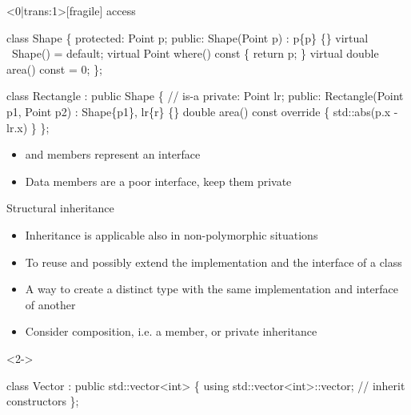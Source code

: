 \begin{frame}<0|trans:1>[fragile]{ access}
  \begin{codeblock}{
class Shape \{
 \alert{protected}:
  Point p;
 public:
  Shape(Point p) : p\{p\} \{\}
  virtual ~Shape() = default;
  virtual Point where() const \{ return p; \}
  virtual double area() const = 0;
\};

class Rectangle : public Shape \{ // is-a
 private:
  Point lr;
 public:
  Rectangle(Point p1, Point p2) : Shape\{p1\}, lr\{r\} \{\}
  double area() const override \{ \ddd std::abs(\alert{p}.x - lr.x) \ddd \}
\};
}\end{codeblock}

  \begin{itemize}[<8->]
  \item {} and  members represent an interface
  \item Data members are a poor interface, keep them private
  \end{itemize}

\end{frame}

\begin{frame}[fragile]{Structural inheritance}

  \begin{itemize}
  \item Inheritance is applicable also in non-polymorphic situations
  \item To reuse and possibly extend the implementation and the interface of a
    class
  \item A way to create a distinct type with the same implementation and
    interface of another
  \item<5-> Consider composition, i.e. a member, or private inheritance
  \end{itemize}

  \begin{codeblock}<2->{
class Vector : public std::vector<int> \{
  using std::vector<int>::vector; // inherit constructors
\};


}\end{codeblock}

\end{frame}

